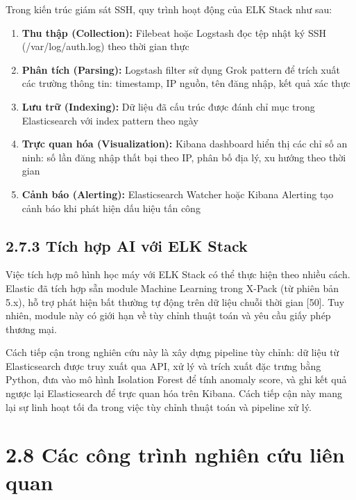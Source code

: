 \documentclass[
  a4paper]{report}
\providecommand{\tightlist}{%
  \setlength{\itemsep}{0pt}\setlength{\parskip}{0pt}}
\begin{document}
Trong kiến trúc giám sát SSH, quy trình hoạt động của ELK Stack như sau:

\begin{enumerate}
\def\labelenumi{\arabic{enumi}.}
\tightlist
\item
  \textbf{Thu thập (Collection):} Filebeat hoặc Logstash đọc tệp nhật ký
  SSH (/var/log/auth.log) theo thời gian thực
\item
  \textbf{Phân tích (Parsing):} Logstash filter sử dụng Grok pattern để
  trích xuất các trường thông tin: timestamp, IP nguồn, tên đăng nhập,
  kết quả xác thực
\item
  \textbf{Lưu trữ (Indexing):} Dữ liệu đã cấu trúc được đánh chỉ mục
  trong Elasticsearch với index pattern theo ngày
\item
  \textbf{Trực quan hóa (Visualization):} Kibana dashboard hiển thị các
  chỉ số an ninh: số lần đăng nhập thất bại theo IP, phân bố địa lý, xu
  hướng theo thời gian
\item
  \textbf{Cảnh báo (Alerting):} Elasticsearch Watcher hoặc Kibana
  Alerting tạo cảnh báo khi phát hiện dấu hiệu tấn công
\end{enumerate}

\subsection{2.7.3 Tích hợp AI với ELK
Stack}\label{tuxedch-hux1ee3p-ai-vux1edbi-elk-stack}

Việc tích hợp mô hình học máy với ELK Stack có thể thực hiện theo nhiều
cách. Elastic đã tích hợp sẵn module Machine Learning trong X-Pack (từ
phiên bản 5.x), hỗ trợ phát hiện bất thường tự động trên dữ liệu chuỗi
thời gian {[}50{]}. Tuy nhiên, module này có giới hạn về tùy chỉnh thuật
toán và yêu cầu giấy phép thương mại.

Cách tiếp cận trong nghiên cứu này là xây dựng pipeline tùy chỉnh: dữ
liệu từ Elasticsearch được truy xuất qua API, xử lý và trích xuất đặc
trưng bằng Python, đưa vào mô hình Isolation Forest để tính anomaly
score, và ghi kết quả ngược lại Elasticsearch để trực quan hóa trên
Kibana. Cách tiếp cận này mang lại sự linh hoạt tối đa trong việc tùy
chỉnh thuật toán và pipeline xử lý.

\section{2.8 Các công trình nghiên cứu liên
quan}\label{cuxe1c-cuxf4ng-truxecnh-nghiuxean-cux1ee9u-liuxean-quan}
\end{document}
